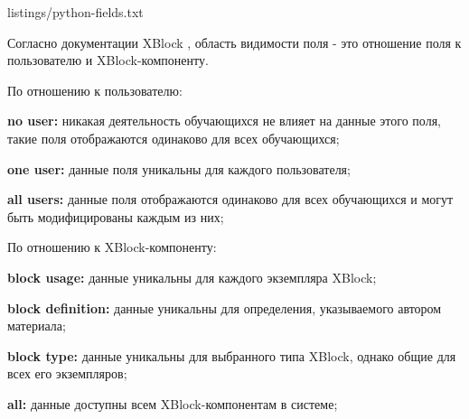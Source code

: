 
{listings/python-fields.txt}

Согласно документации XBlock \cite{xblock-scope}, область видимости поля - это отношение поля к пользователю и XBlock-компоненту. 

По отношению к пользователю: 

\begin{itemize*}
	\item \textbf{no user:} никакая деятельность обучающихся не влияет на данные этого поля, такие поля отображаются одинаково для всех обучающихся;
	\item \textbf{one user:} данные поля уникальны для каждого пользователя;
	\item \textbf{all users:} данные поля отображаются одинаково для всех обучающихся и могут быть модифицированы каждым из них;
\end{itemize*}

По отношению к XBlock-компоненту: 

\begin{itemize*}
	\item \textbf{block usage:} данные уникальны для каждого экземпляра XBlock;
	\item \textbf{block definition:} данные уникальны для определения, указываемого автором материала;
	\item \textbf{block type:} данные уникальны для выбранного типа XBlock, однако общие для всех его экземпляров;
	\item \textbf{all:} данные доступны всем XBlock-компонентам в системе;
\end{itemize*}

